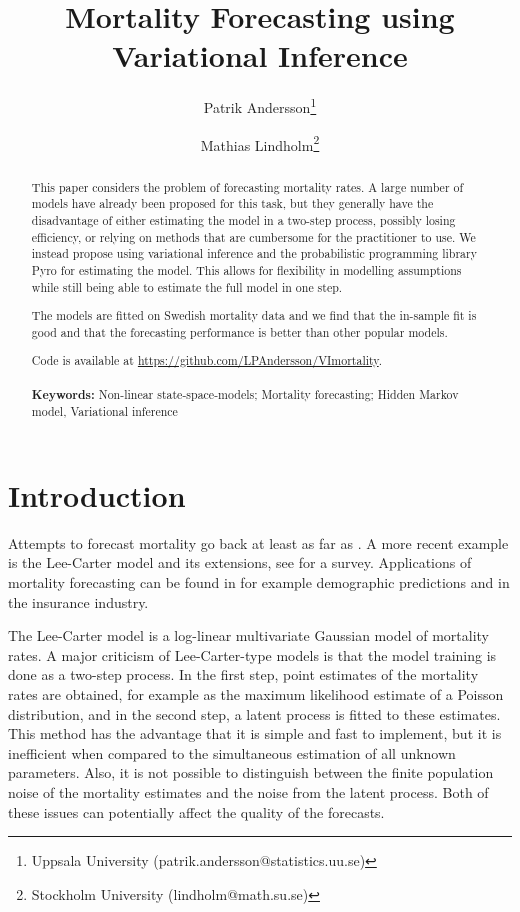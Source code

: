 \documentclass[11pt]{article}
\title{Mortality Forecasting using Variational Inference}
\author{
Patrik Andersson\thanks{Uppsala University ({patrik.andersson@statistics.uu.se})}
\and  
Mathias Lindholm\thanks{Stockholm University ({lindholm@math.su.se})}
}
\date{}
\begin{document}
\maketitle

\begin{abstract}
This paper considers the problem of forecasting mortality rates. A large number of models have already been proposed for this task, but they generally have the disadvantage of either estimating the model in a two-step process, possibly losing efficiency, or relying on methods that are cumbersome for the practitioner to use. We instead propose using variational inference and the probabilistic programming library Pyro for estimating the model. This allows for flexibility in modelling assumptions while still being able to estimate the full model in one step.

The models are fitted on Swedish mortality data and we find that the in-sample fit is good and that the forecasting performance is better than other popular models.

Code is available at \url{https://github.com/LPAndersson/VImortality}. \\\\
\textbf{Keywords:} Non-linear state-space-models; Mortality forecasting; Hidden Markov model, Variational inference
\end{abstract}

\section{Introduction}
Attempts to forecast mortality go back at least as far as \cite{gompertz1825nature}. A more recent example is the Lee-Carter model \citep{lee1992modeling} and its extensions, see \cite{booth2008mortality, haberman2011comparative, carfora2017quantitative} for a survey. Applications of mortality forecasting can be found in for example demographic predictions and in the insurance industry.

The Lee-Carter model is a log-linear multivariate Gaussian model of mortality rates. A major criticism of Lee-Carter-type models is that the model training is done as a two-step process. In the first step, point estimates of the mortality rates are obtained, for example as the maximum likelihood estimate of a Poisson distribution, and in the second step, a latent process is fitted to these estimates. This method has the advantage that it is simple and fast to implement, but it is inefficient when compared to the simultaneous estimation of all unknown parameters. Also, it is not possible to distinguish between the finite population noise of the mortality estimates and the noise from the latent process. Both of these issues can potentially affect the quality of the forecasts. 
\end{document}
